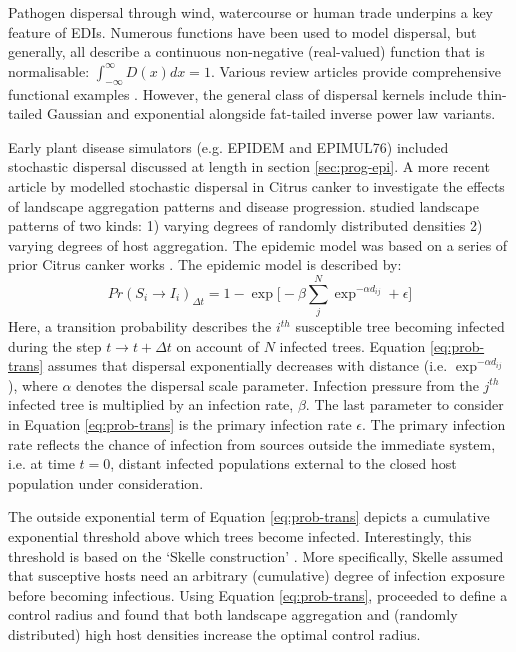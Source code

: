 Pathogen dispersal through wind, watercourse or human trade underpins a key feature of EDIs. 
Numerous functions have been used to model dispersal, but generally, all describe a continuous 
non-negative (real-valued) function that is normalisable: $\int_{-\infty}^{\infty}  D(x)dx = 1$.
Various review articles provide comprehensive functional examples \cite{bullock2017synthesis, nathan2012dispersal, howe1982ecology}.
However, the general class of dispersal kernels include thin-tailed Gaussian and 
exponential alongside fat-tailed inverse power law variants.

Early plant disease simulators (e.g. EPIDEM and EPIMUL76) included stochastic dispersal\textemdash 
discussed at length in section \ref{sec:prog-epi}. A more recent article by \cite{parnell2010effect} 
modelled stochastic dispersal in Citrus canker to investigate the effects of landscape aggregation 
patterns and disease progression.
\cite{parnell2010effect} studied landscape patterns of two kinds: 
1) varying degrees of randomly distributed densities 
2) varying degrees of host aggregation.
The epidemic model was based on a series of prior Citrus canker works
\cite{parnell2009optimal, gilligan2008epidemiological, cook2008constructing}.
The epidemic model is described by:
\begin{equation}
\label{eq:prob-trans}
    Pr(S_i \rightarrow I_i)_{\Delta t} = 1 - \exp\big[- \beta \sum_j^N\exp^{-\alpha d_{ij}} + \epsilon \big]
\end{equation}
Here, a transition probability describes the $i^{th}$ susceptible tree becoming infected 
during the step $t \rightarrow t + \Delta t$ on account of $N$ infected trees.
Equation \ref{eq:prob-trans} assumes that dispersal exponentially decreases with distance (i.e. $\exp^{-\alpha d_{ij}}$), 
where $\alpha$ denotes the dispersal scale parameter. Infection pressure from the $j^{th}$ infected tree is multiplied by an
infection rate, $\beta$. The last parameter to consider in Equation \ref{eq:prob-trans}
is the primary infection rate $\epsilon$. The primary infection rate reflects the chance of infection from sources outside
the immediate system, i.e. at time $t=0$, distant infected populations external to the
closed host population under consideration.

The outside exponential term of Equation \ref{eq:prob-trans} depicts a cumulative exponential threshold above which 
trees become infected. Interestingly, this threshold is based on the `Skelle construction' \cite{sellke1983asymptotic}. 
More specifically, Skelle assumed that susceptive hosts need an arbitrary (cumulative) degree of infection
exposure before becoming infectious. Using Equation \ref{eq:prob-trans}, \cite{parnell2010effect} proceeded to define 
a control radius and found that both landscape aggregation and (randomly distributed) high host densities increase the
optimal control radius. 

